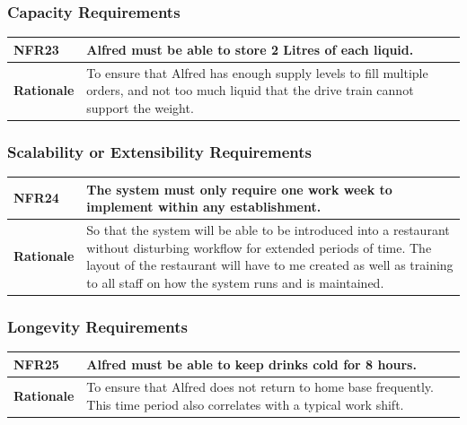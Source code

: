 \documentclass [11pt]{article}
\begin{document}
\subsubsection{Capacity Requirements }

\begin{longtable}{| p{ } | p{ } | }\hline 
\rowcolor{tableCell}\textbf{NFR23} &  Alfred must be able to store 2 Litres of each liquid. \\ \hline
\textbf{Rationale} & To ensure that Alfred has enough supply levels to fill multiple orders, and not too much liquid that the drive train cannot support the weight. \\ \hline
\end{longtable}

\subsubsection{Scalability or Extensibility Requirements }

\begin{longtable}{| p{ } | p{ } | }\hline 
\rowcolor{tableCell}\textbf{NFR24} &  The system must only require one work week to implement within any establishment. \\ \hline
\textbf{Rationale} & So that the system will be able to be introduced into a restaurant without disturbing workflow for extended periods of time. The layout of the restaurant will have to me created as well as training to all staff on how the system runs and is maintained.\\ \hline 
\end{longtable}
\subsubsection{Longevity Requirements }

\begin{longtable}{| p{ } | p{ } | }\hline 
\rowcolor{tableCell}\textbf{NFR25} &  Alfred must be able to keep drinks cold for 8 hours. \\ \hline
\textbf{Rationale} & To ensure that Alfred does not return to home base frequently. This time period also correlates with a typical work shift.\\ \hline 
\end{longtable}
\end{document}
